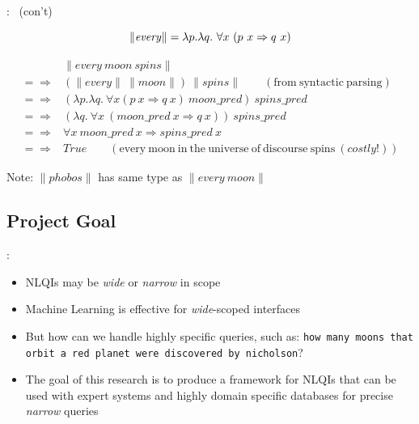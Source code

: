 \documentclass[logoontitle,tabu,supertabular,aspectratio=43]{preney-uwindsor-beamer}
\newcommand{\phobos}{\mathit{phobos}}
\newcommand{\every}{\mathit{every}}
\newcommand{\spins}{\mathit{spins}}
\newcommand{\moon}{\mathit{moon}}
\newcommand{\meaningof}[1]{\lVert #1 \rVert}
\newcommand{\wordpred}[1]{\mathit{#1\_pred}}
\newcommand{\True}{\mathit{True}}
\begin{document}
    \begin{frame}{\insertsection: \insertsubsection\ (con't)}

        \begin{equation*}
            \meaningof{\every} = \lambda p.\lambda q. \  \forall x \  (p \  x \Rightarrow q \  x) \\
        \end{equation*}

        \begin{equation*}
            \begin{split}
                & \meaningof{\every \  \moon \  \spins} \\
                =\!\Rightarrow&  (\meaningof{\every} \  \meaningof{\moon}) \  \meaningof{\spins} \qquad(\mathrm{from}\ \mathrm{syntactic}\ \mathrm{parsing}) \\
                =\!\Rightarrow&  (\lambda p.\lambda q.\ \forall x (p \  x \Rightarrow q \  x) \  \wordpred{\moon}) \  \wordpred{\spins} \\
                =\!\Rightarrow&  (\lambda q.\ \forall x \  (\wordpred{\moon} \   x \Rightarrow q \   x)) \  \wordpred{spins} \\
                =\!\Rightarrow&  \forall x \  \wordpred{\moon} \   x \Rightarrow \wordpred{spins} \   x \\
                =\!\Rightarrow&  \True \qquad(\mathrm{every}\ \mathrm{moon}\ \mathrm{in}\ \mathrm{the}\ \mathrm{universe \ of\ discourse}\ \mathrm{spins}\ (\mathit{costly!}))
            \end{split}
        \end{equation*}
        \centering

        Note: $\meaningof{\phobos}$ has same type as $\meaningof{\every\ \moon}$

    \end{frame}

    \subsection{Project Goal}
    \begin{frame}{\insertsection: \insertsubsection}
        \begin{itemize}
            \item NLQIs may be {\em wide} or {\em narrow} in scope
            \item Machine Learning is effective for {\em wide}-scoped interfaces
            \item But how can we handle highly specific queries, such as: \texttt{how many moons that orbit a red planet were discovered by nicholson}?
            \item The goal of this research is to produce a framework for NLQIs that can be used with expert systems and highly domain specific databases for precise {\em narrow} queries
        \end{itemize}
    \end{frame}
\end{document}
